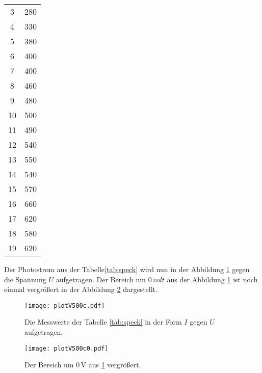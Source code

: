 \begin{center}
\begin{longtable}{c c}
  3   &  280\\
  4   &  330\\
  5   &  380\\
  6   &  400\\
  7   &  400\\
  8   &  460\\
  9   &  480\\
  10  &  500\\
  11  &  490\\
  12  &  540\\
  13  &  550\\
  14  &  540\\
  15  &  570\\
  16  &  660\\
  17  &  620\\
  18  &  580\\
  19  &  620\\
\end{longtable}
\end{center}

Der Photostrom aus der Tabelle\ref{tab:speck} wird nun in der Abbildung \ref{fig:speck} gegen
die Spannung $U$ aufgetragen.
Der
Bereich um  $0\,\si{volt}$ aus der Abbildung \ref{fig:speck} ist
noch einmal vergrößert in der Abbildung \ref{fig:speckzoom} dargestellt.


\begin{figure}
 \centering
 \texttt{[image: plotV500c.pdf]}
 \caption{Die Messwerte der Tabelle \ref{tab:speck} in der Form
 $I$ gegen $U$ aufgetragen.}
 \label{fig:speck}
\end{figure}

\begin{figure}
 \centering
 \texttt{[image: plotV500c0.pdf]}
 \caption{Der Bereich um $0\,\si{\volt}$ aus \ref{fig:speck} vergrößert.}
 \label{fig:speckzoom}
\end{figure}
